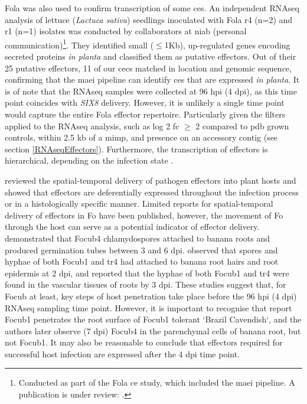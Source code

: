 \ac{Fola} was also used to confirm transcription of some \acp{ce}. An independent RNAseq analysis of lettuce (\textit{Lactuca sativa}) seedlings inoculated with \ac{Fola} \ac{r4} (n=2) and \ac{r1} (n=1) isolates was conducted by collaborators at \ac{niab} (personal communication)\footnote{Conducted as part of the \acl{Fola} \ac{ce} study, which included the \ac{maei} pipeline. A publication is under review: \textcite{FolaManuscript}.}. They identified small ($\le1$Kb), up-regulated genes encoding secreted proteins \textit{in planta} and classified them as putative effectors. Out of their 25 putative effectors, 11 of our \acp{cec} matched in location and genomic sequence, confirming that the \ac{maei} pipeline can identify \acp{ce} that are expressed \textit{in planta}. It is of note that the RNAseq samples were collected at 96 \ac{hpi} (4 \ac{dpi}), as this time point coincides with \textit{SIX8} delivery. However, it is unlikely a single time point would capture the entire \ac{Fola} effector repertoire. Particularly given the filters applied to the RNAseq analysis, such as log 2 \ac{fc} $\geq$ 2 compared to \ac{pdb} grown controls, within 2.5 kb of a \ac{mimp}, and presence on an accessory contig (see section \ref{RNAseqEffectors}). Furthermore, the transcription of effectors is hierarchical, depending on the infection state \parencite{Giraldo2013}. 

\textcite{Toruno2016} reviewed the spatial-temporal delivery of pathogen effectors into plant hosts and showed that effectors are deferentially expressed throughout the infection process or in a histologically specific manner. Limited reports for spatial-temporal delivery of effectors in \ac{Fo} have been published, however, the movement of \ac{Fo} through the host can serve as a potential indicator of effector delivery. \textcite{Li2011} demonstrated that \ac{Focub4} chlamydospores attached to banana roots and produced germination tubes between 3 and 6 \ac{dpi}. \textcite{Li2017} observed that spores and hyphae of both \ac{Focub1} and \ac{tr4} had attached to banana root hairs and root epidermis at 2 \ac{dpi}, and reported that the hyphae of both \ac{Focub1} and \ac{tr4} were found in the vascular tissues of roots by 3 \ac{dpi}. These studies suggest that, for \ac{Focub} at least, key steps of host penetration take place before the 96 \ac{hpi} (4 \ac{dpi}) RNAseq sampling time point. However, it is important to recognise that \textcite{Li2017} report \ac{Focub1} penetrates the root surface of \ac{Focub1} tolerant `Brazil Cavendish`, and the authors later observe (7 \ac{dpi})  \ac{Focub4} in the parenchymal cells of banana root, but not \ac{Focub1}. It may also be reasonable to conclude that effectors required for successful host infection are expressed after the 4 \ac{dpi} time point.  


